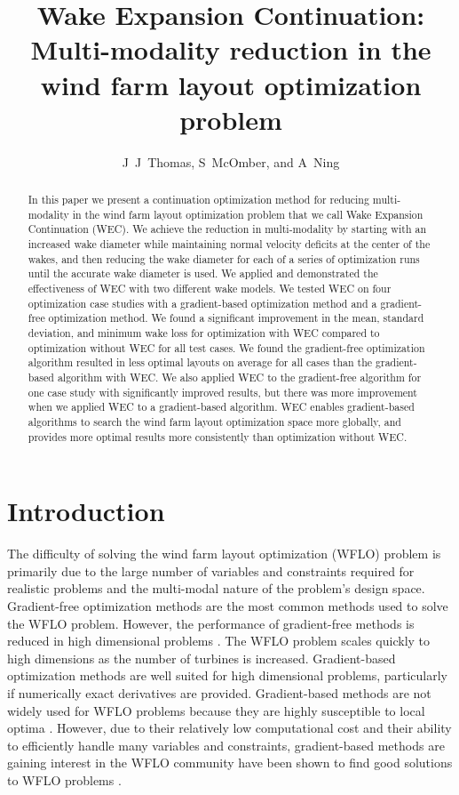 \documentclass{jpconf}
\begin{document}
\title{Wake Expansion Continuation: \large{Multi-modality reduction in the wind farm layout optimization problem}}

\author{J~J~Thomas, S~McOmber, and A~Ning}
\address{Department of Mechanical Engineering,
Brigham Young University, Provo, Utah, USA}

\begin{abstract}
	In this paper we present a continuation optimization method for reducing multi-modality in the wind farm layout optimization problem that we call Wake Expansion Continuation (WEC). We achieve the reduction in multi-modality by starting with an increased wake diameter while maintaining normal velocity deficits at the center of the wakes, and then reducing the wake diameter for each of a series of optimization runs until the accurate wake diameter is used. We applied and demonstrated the effectiveness of WEC with two different wake models. We tested WEC on four optimization case studies with a gradient-based optimization method and a gradient-free optimization method. We found a significant improvement in the mean, standard deviation, and minimum wake loss for optimization with WEC compared to optimization without WEC for all test cases. We found the gradient-free optimization algorithm resulted in less optimal layouts on average for all cases than the gradient-based algorithm with WEC. We also applied WEC to the gradient-free algorithm for one case study with significantly improved results, but there was more improvement when we applied WEC to a gradient-based algorithm. WEC enables gradient-based algorithms to search the wind farm layout optimization space more globally, and provides more optimal results more consistently than optimization without WEC.
\end{abstract}

\section{Introduction}

The difficulty of solving the wind farm layout optimization (WFLO) problem is primarily due to the large number of variables and constraints required for realistic problems and the multi-modal nature of the problem's design space. Gradient-free optimization methods are the most common methods used to solve the WFLO problem. However, the performance of gradient-free methods is reduced in high dimensional problems \cite{rios2013-grad-free-comparison}. The WFLO problem scales quickly to high dimensions as the number of turbines is increased. Gradient-based optimization methods are well suited for high dimensional problems, particularly if numerically exact derivatives are provided. Gradient-based methods are not widely used for WFLO problems because they are highly susceptible to local optima \cite{acero2014}. However, due to their relatively low computational cost and their ability to efficiently handle many variables and constraints, gradient-based methods are gaining interest in the WFLO community have been shown to find good solutions to WFLO problems \cite{fleming2015,guirguis2016,gebraad2017-Maximization-Annual,baker2019,thomas2019-les-validation}.  
\end{document}
